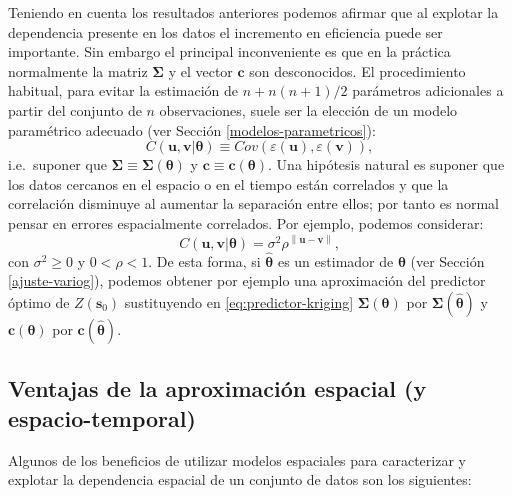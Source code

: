 \documentclass[
]{book}
\theoremstyle{break}
\theoremstyle{definition}
\theoremstyle{definition}
\theoremstyle{definition}
\theoremstyle{definition}
\theoremstyle{remark}
\begin{document}
Teniendo en cuenta los resultados anteriores podemos afirmar que al explotar la dependencia presente en los datos el incremento en eficiencia puede ser importante.
Sin embargo el principal inconveniente es que en la práctica normalmente la matriz \(\boldsymbol{\Sigma}\) y el vector \(\mathbf{c}\) son desconocidos.
El procedimiento habitual, para evitar la estimación de \(n+n(n+1)/2\) parámetros adicionales a partir del
conjunto de \(n\) observaciones, suele ser la elección de un modelo paramétrico adecuado (ver Sección \ref{modelos-parametricos}):
\[C(\mathbf{u},\mathbf{v}\left| \boldsymbol{\theta}\right. )\equiv Cov\left( \varepsilon (\mathbf{u}),\varepsilon (\mathbf{v})\right),\]
i.e.~suponer que \(\boldsymbol{\Sigma} \equiv \boldsymbol{\Sigma}\left( \boldsymbol{\theta}\right)\) y \(\mathbf{c}\equiv \mathbf{c}\left( \boldsymbol{\theta}\right)\).
Una hipótesis natural es suponer que los datos cercanos en el espacio o en el tiempo están correlados y que la correlación disminuye al aumentar la separación entre ellos; por tanto es normal pensar en errores espacialmente correlados.
Por ejemplo, podemos considerar:
\[C(\mathbf{u},\mathbf{v}\left| \boldsymbol{\theta}\right. )=\sigma^{2} \rho^{\left\| \mathbf{u}-\mathbf{v}\right\| },\]
con \(\sigma^{2} \geq 0\) y \(0<\rho <1\).
De esta forma, si \(\hat{\boldsymbol{\theta}}\) es un estimador de \(\boldsymbol{\theta}\) (ver Sección \ref{ajuste-variog}), podemos obtener por ejemplo una aproximación del predictor óptimo de \(Z(\mathbf{s}_{0} )\) sustituyendo en \eqref{eq:predictor-kriging} \(\boldsymbol{\Sigma}(\boldsymbol{\theta})\) por \(\boldsymbol{\Sigma}(\hat{\boldsymbol{\theta}} )\) y \(\mathbf{c}(\boldsymbol{\theta})\) por \(\mathbf{c}(\hat{\boldsymbol{\theta}} )\).

\subsection{Ventajas de la aproximación espacial (y espacio-temporal)}\label{ventajas-de-la-aproximaciuxf3n-espacial-y-espacio-temporal}

Algunos de los beneficios de utilizar modelos espaciales para caracterizar y explotar la dependencia espacial de un conjunto de datos son los siguientes:
\end{document}
